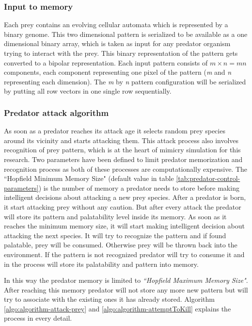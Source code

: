 \subsubsection{Input to memory}
Each prey contains an evolving cellular automata which is represented by a binary genome. This two dimensional pattern is serialized to be available as a one dimensional binary array, which is taken as input for any predator organism trying to interact with the prey. This binary representation of the pattern gets converted to a bipolar representation. Each input pattern consists of \(\textit{m} \times \textit{n} = \textit{mn}\) components, each component representing one pixel of the pattern (\textit{m} and \textit{n} representing each dimension). The \textit{m} by \textit{n} pattern configuration will be serialized by putting all row vectors in one single row sequentially.

\subsubsection{Predator attack algorithm}
As soon as a predator reaches its attack age it selects random prey species around its vicinity and starts attacking them. This attack process also involves recognition of prey pattern, which is at the heart of mimicry simulation for this research. Two parameters have been defined to limit predator memorization and recognition process as both of these processes are computationally expensive. The ``Hopfield Minimum Memory Size" (default value in table \ref{tab:predator-control-parameters}) is the number of memory a predator needs to store before making intelligent decisions about attacking a new prey species. After a predator is born, it start attacking prey without any caution. But after every attack the predator will store its pattern and palatability level inside its memory. As soon as it reaches the minimum memory size, it will start making intelligent decision about attacking the next species. It will try to recognize the pattern and if found palatable, prey will be consumed. Otherwise prey will be thrown back into the environment. If the pattern is not recognized predator will try to consume it and in the process will store its palatability and pattern into memory. 

In this way the predator memory is limited to \textsl{``Hopfield Maximum Memory Size"}. After reaching this memory predator will not store any more new pattern but will try to associate with the existing ones it has already stored. Algorithm \ref{algo:algorithm-attack-prey} and \ref{algo:algorithm-attemptToKill} explains the process in every detail.

